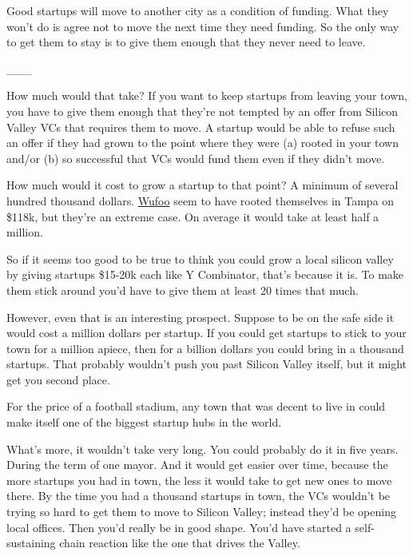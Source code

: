 Good startups will move
                  to another city as a condition of funding. What they won't do
                  is agree not to move the next time they need funding. So the
                  only way to get them to stay is to give them enough that they
                  never need to leave.


                  \_\_\_
                  

How much would that take? If you want to keep
                  startups from leaving your town, you have to give them enough
                  that they're not tempted by an offer from Silicon Valley VCs
                  that requires them to move. A startup would be able to refuse
                  such an offer if they had grown to the point where they were
                  (a) rooted in your town and/or (b) so successful that VCs
                  would fund them even if they didn't move.

How much
                  would it cost to grow a startup to that point? A minimum of
                  several hundred thousand dollars.
                  \href{http://wufoo.com}{Wufoo} seem to have rooted
                  themselves in Tampa on \$118k, but they're an extreme case. On
                  average it would take at least half a million.

So
                  if it seems too good to be true to think you could grow a
                  local silicon valley by giving startups \$15-20k each like Y
                  Combinator, that's because it is. To make them stick around
                  you'd have to give them at least 20 times that much.

However,
                  even that is an interesting prospect. Suppose to be on the
                  safe side it would cost a million dollars per startup. If you
                  could get startups to stick to your town for a million apiece,
                  then for a billion dollars you could bring in a thousand
                  startups. That probably wouldn't push you past Silicon Valley
                  itself, but it might get you second place.

For the
                  price of a football stadium, any town that was decent to live
                  in could make itself one of the biggest startup hubs in the
                  world.

What's more, it wouldn't take very long. You
                  could probably do it in five years. During the term of one
                  mayor. And it would get easier over time, because the more
                  startups you had in town, the less it would take to get new
                  ones to move there. By the time you had a thousand startups in
                  town, the VCs wouldn't be trying so hard to get them to move
                  to Silicon Valley; instead they'd be opening local offices.
                  Then you'd really be in good shape. You'd have started a
                  self-sustaining chain reaction like the one that drives the
                  Valley.


